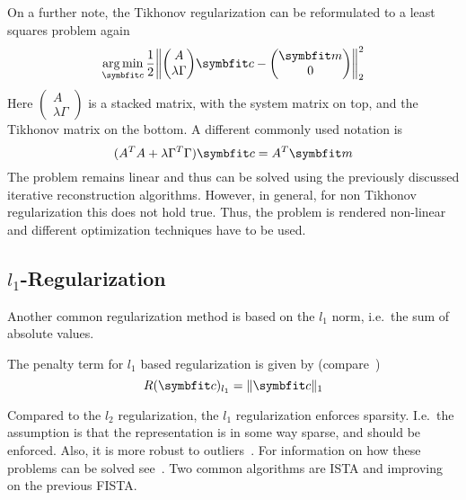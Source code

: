 On a further note, the Tikhonov regularization can be reformulated to a least squares problem again
\begin{equation}
	\argmin_{\mvec{c}} \frac{1}{2}
	\left\lVert
	\begin{pmatrix}
		A \\
		\lambda \Gamma
	\end{pmatrix}
	\mvec{c} -
	\begin{pmatrix}
		\mvec{m} \\
		0
	\end{pmatrix}
	\right\rVert_2^2
\end{equation}
Here \(\begin{pmatrix}
	A \\
	\lambda \Gamma
\end{pmatrix}\) is a stacked matrix, with the system matrix on top, and the Tikhonov matrix on the
bottom. A different commonly used notation is
\begin{equation}
	(A^T A + \lambda \Gamma^T \Gamma)\mvec{c} = A^T \mvec{m}
\end{equation}
The problem remains linear and thus can be solved using the previously discussed iterative
reconstruction algorithms. However, in general, for non Tikhonov regularization this does not hold
true. Thus, the problem is rendered non-linear and different optimization techniques have to be
used.

\subsection{\(l_1\)-Regularization}\label{subsec:l1_regularization}

Another common regularization method is based on the \(l_1\) norm, i.e.\ the sum of absolute
values.
\begin{definition}[ \(l_1\)-Regularization]\label{def:l1_regularization}
	The penalty term for \(l_1\) based regularization is given by
	(compare~\cite{tibshirani_regression_1996,tibshirani_lasso_2013,beck_fast_2009})
	\[
		R(\mvec{c})_{l_1} = \norm{\mvec{c}}_1
	\]
\end{definition}
Compared to the \(l_2\) regularization, the \(l_1\) regularization enforces sparsity. I.e.\ the
assumption is that the representation is in some way sparse, and should be enforced. Also, it is
more robust to outliers~\cite{beck_fast_2009}. For information on how these problems can be solved
see~\cite{beck_fast_2009}. Two common algorithms are \gls{ISTA} and improving on the previous
\gls{FISTA}.

